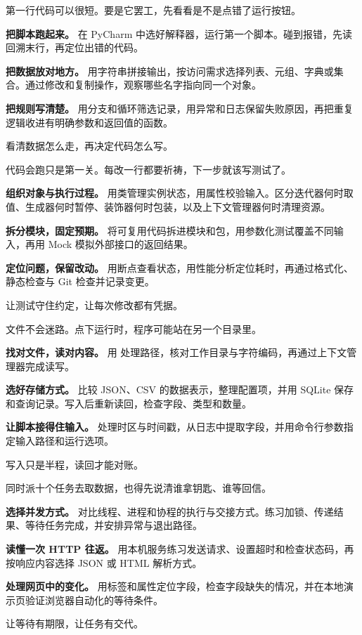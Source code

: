 \documentclass[UTF8,a4paper,oneside,openany,fontset=none,11pt]{ctexbook}
\begin{document}
\hypersetup{pageanchor=false}


\frontmatter
\hypersetup{pageanchor=true}





\tableofcontents

\mainmatter

  {第一行代码可以很短。要是它罢工，先看看是不是点错了运行按钮。}
  {\textbf{把脚本跑起来。} 在 PyCharm 中选好解释器，运行第一个脚本。碰到报错，先读回溯末行，再定位出错的代码。

   \textbf{把数据放对地方。} 用字符串拼接输出，按访问需求选择列表、元组、字典或集合。通过修改和复制操作，观察哪些名字指向同一个对象。

   \textbf{把规则写清楚。} 用分支和循环筛选记录，用异常和日志保留失败原因，再把重复逻辑收进有明确参数和返回值的函数。}
  {看清数据怎么走，再决定代码怎么写。}





  {代码会跑只是第一关。每改一行都要祈祷，下一步就该写测试了。}
  {\textbf{组织对象与执行过程。} 用类管理实例状态，用属性校验输入。区分迭代器何时取值、生成器何时暂停、装饰器何时包装，以及上下文管理器何时清理资源。

   \textbf{拆分模块，固定预期。} 将可复用代码拆进模块和包，用参数化测试覆盖不同输入，再用 Mock 模拟外部接口的返回结果。

   \textbf{定位问题，保留改动。} 用断点查看状态，用性能分析定位耗时，再通过格式化、静态检查与 Git 检查并记录变更。}
  {让测试守住约定，让每次修改都有凭据。}





  {文件不会迷路。点下运行时，程序可能站在另一个目录里。}
  {\textbf{找对文件，读对内容。} 用  处理路径，核对工作目录与字符编码，再通过上下文管理器完成读写。

   \textbf{选好存储方式。} 比较 JSON、CSV 的数据表示，整理配置项，并用 SQLite 保存和查询记录。写入后重新读回，检查字段、类型和数量。

   \textbf{让脚本接得住输入。} 处理时区与时间戳，从日志中提取字段，并用命令行参数指定输入路径和运行选项。}
  {写入只是半程，读回才能对账。}




  {同时派十个任务去取数据，也得先说清谁拿钥匙、谁等回信。}
  {\textbf{选择并发方式。} 对比线程、进程和协程的执行与交接方式。练习加锁、传递结果、等待任务完成，并安排异常与退出路径。

   \textbf{读懂一次 HTTP 往返。} 用本机服务练习发送请求、设置超时和检查状态码，再按响应内容选择 JSON 或 HTML 解析方式。

   \textbf{处理网页中的变化。} 用标签和属性定位字段，检查字段缺失的情况，并在本地演示页验证浏览器自动化的等待条件。}
  {让等待有期限，让任务有交代。}


\end{document}
